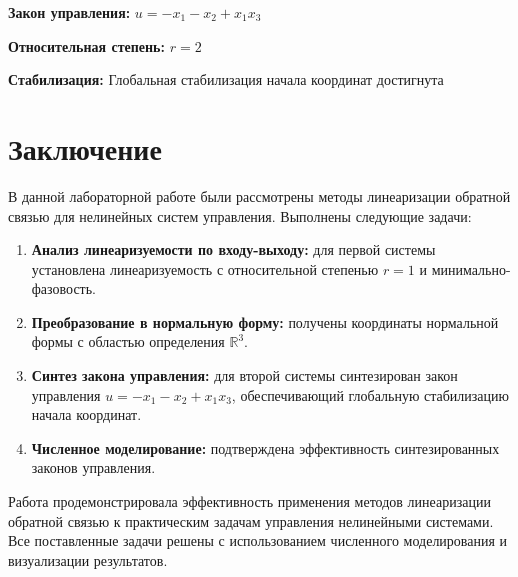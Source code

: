\textbf{Закон управления:} $u = -x_1 - x_2 + x_1 x_3$

\textbf{Относительная степень:} $r = 2$

\textbf{Стабилизация:} Глобальная стабилизация начала координат достигнута

\section*{Заключение}

В данной лабораторной работе были рассмотрены методы линеаризации обратной связью для нелинейных систем управления. Выполнены следующие задачи:

\begin{enumerate}
\item \textbf{Анализ линеаризуемости по входу-выходу:} для первой системы установлена линеаризуемость с относительной степенью $r = 1$ и минимально-фазовость.

\item \textbf{Преобразование в нормальную форму:} получены координаты нормальной формы с областью определения $\mathbb{R}^3$.

\item \textbf{Синтез закона управления:} для второй системы синтезирован закон управления $u = -x_1 - x_2 + x_1 x_3$, обеспечивающий глобальную стабилизацию начала координат.

\item \textbf{Численное моделирование:} подтверждена эффективность синтезированных законов управления.
\end{enumerate}

Работа продемонстрировала эффективность применения методов линеаризации обратной связью к практическим задачам управления нелинейными системами. Все поставленные задачи решены с использованием численного моделирования и визуализации результатов.
